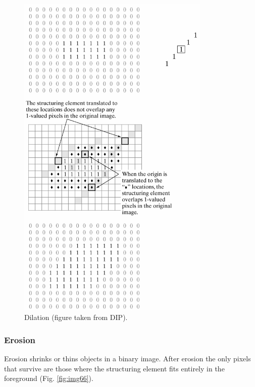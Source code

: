 \begin{figure}[htbp]
\begin{center}
\includegraphics[width=9.222cm]{img/CMCIBasicCourse201102-img65.png}
\caption{ Dilation (figure taken from DIP).}
\label{fig:img65}
\end{center}
\end{figure}



\subsubsection{Erosion}
Erosion shrinks or thins objects in a binary image. After erosion the
only pixels that survive are those where the structuring element fits
entirely in the foreground (Fig. \ref{fig:img66}).

